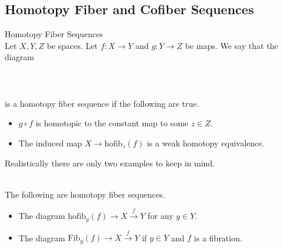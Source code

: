 \documentclass[a4paper]{article}
\begin{document}
\subsection{Homotopy Fiber and Cofiber Sequences}
\begin{defn}{Homotopy Fiber Sequences}{}\\
Let $X,Y,Z$ be spaces. Let $f:X\to Y$ and $g:Y\to Z$ be maps. We say that the diagram \\~\\
\\~\\
is a homotopy fiber sequence if the following are true. 
\begin{itemize}
\item $g\circ f$ is homotopic to the constant map to some $z\in Z$. 
\item The induced map $X\to\text{hofib}_z(f)$ is a weak homotopy equivalence. 
\end{itemize}
\end{defn}

Realistically there are only two examples to keep in mind. 

\begin{eg}{}{}\\
The following are homotopy fiber sequences. 
\begin{itemize}
\item The diagram $\text{hofib}_y(f)\to X\overset{f}{\to}Y$ for any $y\in Y$. 
\item The diagram $\text{Fib}_y(f)\to X\overset{f}{\to}Y$ if $y\in Y$ and $f$ is a fibration. 
\end{itemize}
\end{eg}
\end{document}
